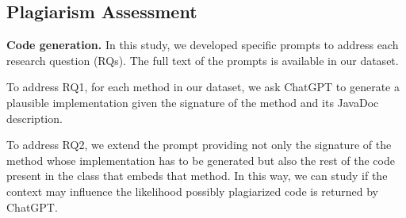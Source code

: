 \subsection{Plagiarism Assessment}


\textbf{Code generation.} %
In this study, we developed specific prompts to address each research question (RQs). The full text of the prompts is available in our dataset. %

To address RQ1, for each method in our dataset, we ask ChatGPT to generate a plausible implementation given the signature of the method and its JavaDoc description. %

To address RQ2, %
we extend the prompt providing not only the signature of the method whose implementation has to be generated but also the rest of the code present in the class that embeds that method. In this way, we can study if the context may influence the likelihood possibly plagiarized code is returned by ChatGPT. %


